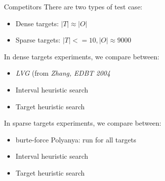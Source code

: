\begin{frame}{Competitors}
\small{There are two types of test case:}
\begin{itemize}
    \item<1-> \small{Dense targets: $|T| \approx |O|$}
    \item<1-> \small{Sparse targets: $|T| <= 10, |O| \approx 9000$}
\end{itemize}
\small{In dense targets experiments, we compare between:}
\begin{itemize}
    \item<1-> \small{\textit{LVG} (from \textit{Zhang, EDBT 2004}}
    \item<1-> \small{Interval heuristic search}
    \item<1-> \small{Target heuristic search}
\end{itemize}
\small{In sparse targets experiments, we compare between:}
\begin{itemize}
    \item<1-> \small{burte-force Polyanya: run for all targets}
    \item<1-> \small{Interval heuristic search}
    \item<1-> \small{Target heuristic search}
\end{itemize}
\end{frame}

